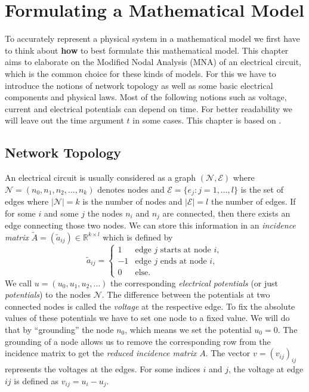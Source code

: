 \chapter{Formulating a Mathematical Model}

To accurately represent a physical system in a mathematical model we first have to think about \textbf{how} to best formulate this mathematical model.
This chapter aims to elaborate on the Modified Nodal Analysis (MNA) of an electrical circuit, which is the common choice for these kinds of models. For this we have to introduce the notions of network topology as well as some basic electrical components and physical laws. Most of the following notions such as voltage, current and electrical potentials can depend on time. For better readability we will leave out the time argument $t$ in some cases. This chapter is based on \cite{ModellingAndDiscretizationOfCircuitProblems}.

\section{Network Topology}
\label{Sec:Network Topology}
An electrical circuit is usually considered as a graph $(\mathcal{N},\mathcal{E})$ where $\mathcal{N} = (n_0, n_1, n_2, ..., n_k)$ denotes nodes and $\mathcal{E} = \{e_{j}: j = 1,...,l\}$ is the set of edges where $|\mathcal{N}| = k$ is the number of nodes and $|\mathcal{E}| = l$ the number of edges. If for some $i$ and some $j$ the nodes $n_i$ and  $n_j$ are connected, then there exists an edge connecting those two nodes.
We can store this information in an \emph{incidence matrix} $\tilde{A} = (\tilde{a}_{ij}) \in \mathbb{R}^{k \times l}$ which is defined by
\begin{displaymath}
	\tilde{a}_{ij} = 
	\begin{cases}
		1 &   \text{edge $j$ starts at node $i$},\\
		-1 &  \text{edge $j$  ends at node $i$},\\
		0 & \text{else}.				
	\end{cases}
\end{displaymath}
We call $u = (u_0, u_1, u_2, ...)$ the corresponding \emph{electrical potentials} (or just \emph{potentials}) to the nodes $\mathcal{N}$. The difference between the potentials at two connected nodes is called the \emph{voltage} at the respective edge. To fix the absolute values of these potentials we have to set one node to a fixed value. We will do that by ``grounding'' the node $n_0$, which means we set the potential $u_0 = 0$. The grounding of a node allows us to remove the corresponding row from the incidence matrix to get the \emph{reduced incidence matrix} $A$. The vector $v = (v_{ij})_{ij}$ represents the voltages at the edges. For some indices $i$ and $j$, the voltage at edge $ij$ is defined as $v_{ij} = u_i - u_j$.

